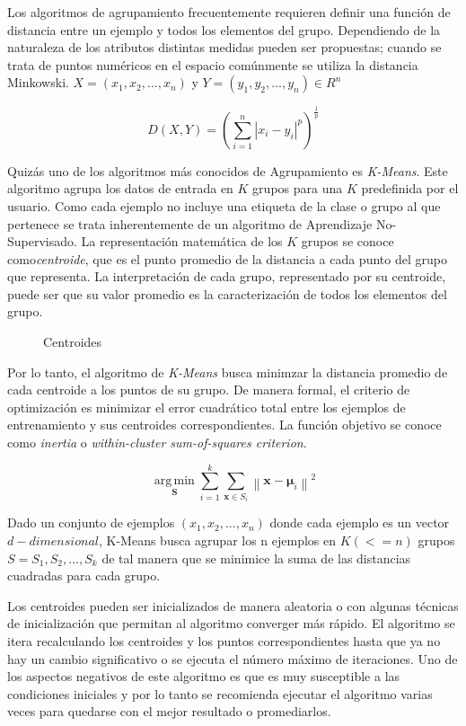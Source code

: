 Los algoritmos de agrupamiento frecuentemente requieren definir una función de distancia entre un ejemplo y todos los elementos del grupo. Dependiendo de la naturaleza de los atributos distintas medidas pueden ser propuestas; cuando se trata de puntos numéricos en el espacio comúnmente se utiliza la distancia Minkowski. $X = (x_1,x_2,\ldots,x_n)$ y $Y=(y_1,y_2,\ldots ,y_n) \in R^n$
 
$$D(X,Y) = (\sum_{i=1}^{n}|x_{i}-y_{i}|^{p})^{\frac{1}{p}}$$

Quizás uno de los algoritmos más conocidos de Agrupamiento es \textit{K-Means}. Este algoritmo agrupa los datos de entrada en $K$ grupos para una $K$ predefinida por el usuario. Como cada ejemplo no incluye una etiqueta de la clase o grupo al que pertenece se trata inherentemente de un algoritmo de Aprendizaje No-Supervisado. La representación matemática de los $K$ grupos se conoce como\textit{centroide}, que es el punto promedio de la distancia a cada punto del grupo que representa. La interpretación de cada grupo, representado por su centroide, puede ser que su valor promedio es la caracterización de todos los elementos del grupo.

 \begin{figure}[htbp]
   \centering
   
    \caption{Centroides}
    \label{fig:centroides}
\end{figure}

Por lo tanto, el algoritmo de \textit{K-Means} busca minimzar la distancia promedio de cada centroide a los puntos de su grupo. De manera formal, el criterio de optimización es minimizar el error cuadrático total entre los ejemplos de entrenamiento y sus centroides correspondientes. La función objetivo se conoce como \textit{inertia} o \textit{within-cluster sum-of-squares criterion}.

$$\displaystyle {\underset {\mathbf {S} }{\operatorname {arg\,min} }}\sum _{i=1}^{k}\sum _{\mathbf {x} \in S_{i}}\left\|\mathbf {x} -{\boldsymbol {\mu }}_{i}\right\|^{2}$$

Dado un conjunto de ejemplos $(x_1, x_2, ..., x_n)$ donde cada ejemplo es un vector $d-dimensional$, K-Means busca agrupar los n ejemplos en $K(<=n)$ grupos $S = {S_1, S_2, ..., S_k}$ de tal manera que se minimice la suma de las distancias cuadradas para cada grupo.

Los centroides pueden ser inicializados de manera aleatoria o con algunas técnicas de inicialización que permitan al algoritmo converger más rápido. El algoritmo se itera recalculando los centroides y los puntos correspondientes hasta que ya no hay un cambio significativo o se ejecuta el número máximo de iteraciones. Uno de los aspectos negativos de este algoritmo es que es muy susceptible a las condiciones iniciales y por lo tanto se recomienda ejecutar el algoritmo varias veces para quedarse con el mejor resultado o promediarlos.

